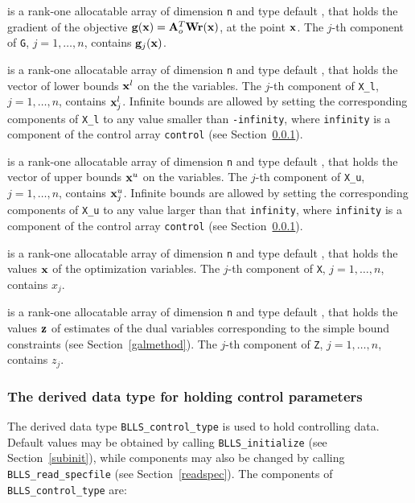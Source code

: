 \documentclass{galahad}
\newcommand{\packagename}{BLLS}
\begin{document}
\begin{description}
 is a rank-one allocatable array of dimension {\tt n} and type
default \realdp, that holds the gradient of the objective
 ${\mathbf{g}}({\mathbf{x}}) = {\mathbf{A}}_o^T {\mathbf{W}} {\mathbf{r}}({\mathbf{x}})$, at the point ${\mathbf{x}}$. 
The $j$-th component of {\tt G}, $j = 1, \ldots, n$, contains ${\mathbf{g}}_{j}({\mathbf{x}})$.

 is a rank-one allocatable array of dimension {\tt n} and type
default \realdp, that holds
the vector of lower bounds ${\mathbf{x}}^{l}$ on the the variables.
The $j$-th component of {\tt X\_l}, $j = 1, \ldots , n$,
contains ${\mathbf{x}}_{j}^{l}$.
Infinite bounds are allowed by setting the corresponding
components of {\tt X\_l} to any value smaller than {\tt -infinity},
where {\tt infinity} is a component of the control array {\tt control}
(see Section~\ref{typecontrol}).

 is a rank-one allocatable array of dimension {\tt n} and type
default \realdp, that holds
the vector of upper bounds ${\mathbf{x}}^{u}$ on the variables.
The $j$-th component of {\tt X\_u}, $j = 1, \ldots , n$,
contains ${\mathbf{x}}_{j}^{u}$.
Infinite bounds are allowed by setting the corresponding
components of {\tt X\_u} to any value larger than that {\tt infinity},
where {\tt infinity} is a component of the control array {\tt control}
(see Section~\ref{typecontrol}).

 is a rank-one allocatable array of dimension {\tt n} and type
default \realdp,
that holds the values ${\mathbf{x}}$ of the optimization variables.
The $j$-th component of {\tt X}, $j = 1,  \ldots , n$, contains $x_{j}$.

 is a rank-one allocatable array of dimension {\tt n} and type default
\realdp, that holds
the values ${\mathbf{z}}$ of estimates  of the dual variables
corresponding to the simple bound constraints (see Section~\ref{galmethod}).
The $j$-th component of {\tt Z}, $j = 1,  \ldots ,  n$, contains $z_{j}$.

\end{description}


\subsubsection{The derived data type for holding control
 parameters}\label{typecontrol}
The derived data type
{\tt \packagename\_control\_type}
is used to hold controlling data. Default values may be obtained by calling
{\tt \packagename\_initialize}
(see Section~\ref{subinit}),
while components may also be changed by calling
{\tt \packagename\_read\-\_specfile}
(see Section~\ref{readspec}).
The components of
{\tt \packagename\_control\_type}
are:
\end{document}
